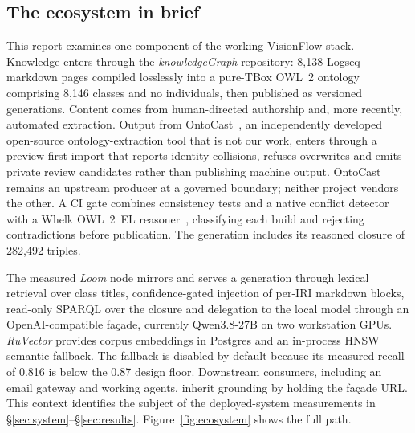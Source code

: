 \documentclass[10pt,twocolumn]{article}
\begin{document}
\subsection{The ecosystem in brief}\label{sec:ecosystem}
This report examines one component of the working VisionFlow stack. Knowledge enters through the \emph{knowledgeGraph} repository: 8{,}138 Logseq markdown pages compiled losslessly into a pure-TBox OWL~2 ontology comprising 8{,}146 classes and no individuals, then published as versioned generations. Content comes from human-directed authorship and, more recently, automated extraction. Output from OntoCast~\cite{ontocast}, an independently developed open-source ontology-extraction tool that is not our work, enters through a preview-first import that reports identity collisions, refuses overwrites and emits private review candidates rather than publishing machine output. OntoCast remains an upstream producer at a governed boundary; neither project vendors the other. A CI gate combines consistency tests and a native conflict detector with a Whelk OWL~2~EL reasoner~\cite{whelk}, classifying each build and rejecting contradictions before publication. The generation includes its reasoned closure of 282{,}492 triples.

The measured \emph{Loom} node mirrors and serves a generation through lexical retrieval over class titles, confidence-gated injection of per-IRI markdown blocks, read-only SPARQL over the closure and delegation to the local model through an OpenAI-compatible fa\c{c}ade, currently Qwen3.8-27B on two workstation GPUs. \emph{RuVector} provides corpus embeddings in Postgres and an in-process HNSW semantic fallback. The fallback is disabled by default because its measured recall of 0.816 is below the 0.87 design floor. Downstream consumers, including an email gateway and working agents, inherit grounding by holding the fa\c{c}ade URL. This context identifies the subject of the deployed-system measurements in \S\ref{sec:system}--\S\ref{sec:results}. Figure~\ref{fig:ecosystem} shows the full path.


\end{document}
